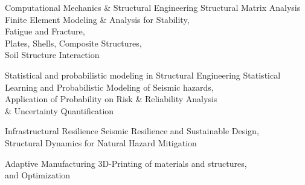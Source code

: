 

\begin{cvskills}
\vspace{7pt}
\cvskill
	{Computational Mechanics \& Structural Engineering} %
	{Structural Matrix Analysis $\hspace{2500pt}$ Finite Element Modeling \& Analysis for Stability, $\hspace{2500pt}$ Fatigue and Fracture, $\hspace{2500pt}$ Plates, Shells, Composite Structures, $\hspace{2500pt}$ Soil Structure Interaction} %


\vspace{7pt}



\cvskill
	{Statistical and probabilistic modeling in Structural Engineering} %
	{Statistical Learning and Probabilistic Modeling of Seismic hazards, $\hspace{2500pt}$ Application of Probability on Risk \& Reliability Analysis $\hspace{2500pt}$ \& Uncertainty Quantification} %



\vspace{7pt}

\cvskill
	{Infrastructural Resilience  } %
	{Seismic Resilience and Sustainable Design, $\hspace{2500pt}$ Structural Dynamics for Natural Hazard Mitigation} %



\vspace{7pt}
\cvskill
	{Adaptive Manufacturing } %
	{3D-Printing of materials and structures, $\hspace{2500pt}$ and Optimization} %
	
\end{cvskills}
